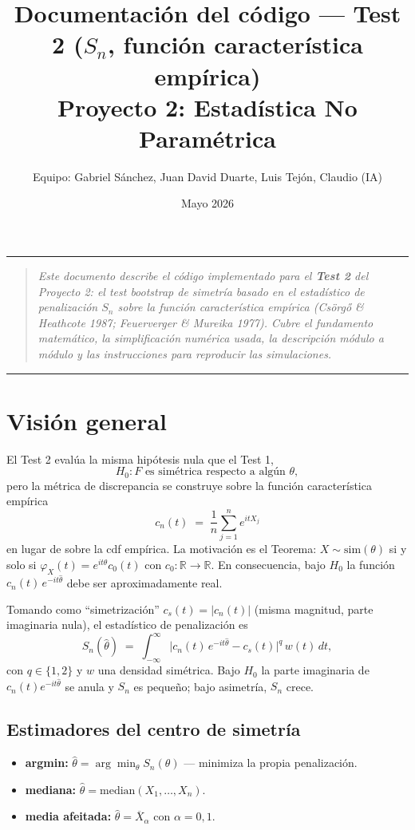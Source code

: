 \documentclass[11pt,a4paper]{article}
\title{\textbf{Documentación del código --- Test 2 ($S_n$, función característica empírica)}\\[0.5em]
\large Proyecto 2: Estadística No Paramétrica}
\author{Equipo: Gabriel Sánchez, Juan David Duarte, Luis Tejón, Claudio (IA)}
\date{Mayo 2026}
\begin{document}
\maketitle

\hrule
\vspace{0.5em}
\begin{quote}\small\itshape
Este documento describe el código implementado para el \textbf{Test 2}
del Proyecto 2: el test bootstrap de simetría basado en el estadístico
de penalización $S_n$ sobre la función característica empírica
(Csörgő \& Heathcote 1987; Feuerverger \& Mureika 1977). Cubre el
fundamento matemático, la simplificación numérica usada, la descripción
módulo a módulo y las instrucciones para reproducir las simulaciones.
\end{quote}
\vspace{0.5em}
\hrule

\tableofcontents
\newpage

\section{Visión general}

El Test 2 evalúa la misma hipótesis nula que el Test 1,
\[
H_0 : F \text{ es simétrica respecto a algún } \theta,
\]
pero la métrica de discrepancia se construye sobre la función
característica empírica
\[
c_n(t) \;=\; \frac{1}{n}\sum_{j=1}^{n} e^{itX_j}
\]
en lugar de sobre la cdf empírica. La motivación es el Teorema:
$X\sim\mathrm{sim}(\theta)$ si y solo si $\varphi_X(t)=e^{it\theta}c_0(t)$
con $c_0:\mathbb{R}\to\mathbb{R}$. En consecuencia, bajo $H_0$ la función
$c_n(t)\,e^{-it\hat\theta}$ debe ser aproximadamente real.

Tomando como ``simetrización'' $c_s(t)=|c_n(t)|$ (misma magnitud, parte
imaginaria nula), el estadístico de penalización es
\begin{equation}\label{eq:Sn}
S_n(\hat\theta) \;=\; \int_{-\infty}^{\infty}
\bigl|c_n(t)\,e^{-it\hat\theta} - c_s(t)\bigr|^q \, w(t)\,dt,
\end{equation}
con $q\in\{1,2\}$ y $w$ una densidad simétrica. Bajo $H_0$ la parte
imaginaria de $c_n(t)e^{-it\hat\theta}$ se anula y $S_n$ es pequeño;
bajo asimetría, $S_n$ crece.

\subsection{Estimadores del centro de simetría}
\begin{itemize}[leftmargin=*]
    \item \textbf{argmin:} $\hat\theta=\arg\min_\theta S_n(\theta)$ — minimiza la propia penalización.
    \item \textbf{mediana:} $\hat\theta=\mathrm{median}(X_1,\dots,X_n)$.
    \item \textbf{media afeitada:} $\hat\theta=\overline X_\alpha$ con $\alpha=0{,}1$.
\end{itemize}
\end{document}
